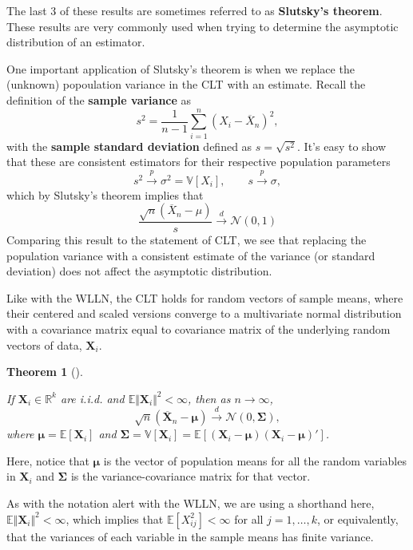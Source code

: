 \documentclass[
  letterpaper,
  DIV=11,
  numbers=noendperiod]{scrreprt}
\newcommand{\mb}{\symbf}
\newcommand{\E}{\mathbb{E}}
\newcommand{\V}{\mathbb{V}}
\newcommand{\N}{\mathcal{N}}
\newcommand{\Xbar}{\overline{X}}
\newcommand{\X}{\mb{X}}
\newcommand{\inprob}{\overset{p}{\to}}
\newcommand{\indist}{\overset{d}{\to}}
\theoremstyle{definition}
\theoremstyle{plain}
\newtheorem{theorem}{Theorem}[chapter]
\theoremstyle{definition}
\theoremstyle{remark}
\begin{document}
The last 3 of these results are sometimes referred to as
\textbf{Slutsky's theorem}. These results are very commonly used when
trying to determine the asymptotic distribution of an estimator.

One important application of Slutsky's theorem is when we replace the
(unknown) popoulation variance in the CLT with an estimate. Recall the
definition of the \textbf{sample variance} as \[
s^2 = \frac{1}{n-1} \sum_{i=1}^n (X_i - \Xbar_n)^2,
\] with the \textbf{sample standard deviation} defined as
\(s = \sqrt{s^2}\). It's easy to show that these are consistent
estimators for their respective population parameters \[ 
s^2 \inprob \sigma^2 = \V[X_i], \qquad s \inprob \sigma,
\] which by Slutsky's theorem implies that \[
\frac{\sqrt{n}\left(\Xbar_n - \mu\right)}{s} \indist \N(0, 1)
\] Comparing this result to the statement of CLT, we see that replacing
the population variance with a consistent estimate of the variance (or
standard deviation) does not affect the asymptotic distribution.

Like with the WLLN, the CLT holds for random vectors of sample means,
where their centered and scaled versions converge to a multivariate
normal distribution with a covariance matrix equal to covariance matrix
of the underlying random vectors of data, \(\X_i\).

\leavevmode{}%
\begin{theorem}[]\label{thm-multivariate-clt}

If \(\mb{X}_i \in \mathbb{R}^k\) are i.i.d. and
\(\E\Vert \mb{X}_i \Vert^2 < \infty\), then as \(n \to \infty\), \[
\sqrt{n}\left( \overline{\mb{X}}_n - \mb{\mu}\right) \indist \N(0, \mb{\Sigma}),
\] where \(\mb{\mu} = \E[\mb{X}_i]\) and
\(\mb{\Sigma} = \V[\mb{X}_i] = \E\left[(\mb{X}_i-\mb{\mu})(\mb{X}_i - \mb{\mu})'\right]\).

\end{theorem}

Here, notice that \(\mb{\mu}\) is the vector of population means for all
the random variables in \(\X_i\) and \(\mb{\Sigma}\) is the
variance-covariance matrix for that vector.

\begin{tcolorbox}[enhanced jigsaw, title=\textcolor{quarto-callout-note-color}{\faInfo}\hspace{0.5em}{Note}, breakable, titlerule=0mm, opacityback=0, rightrule=.15mm, bottomrule=.15mm, colframe=quarto-callout-note-color-frame, coltitle=black, colbacktitle=quarto-callout-note-color!10!white, bottomtitle=1mm, toptitle=1mm, colback=white, arc=.35mm, opacitybacktitle=0.6, toprule=.15mm, leftrule=.75mm, left=2mm]

As with the notation alert with the WLLN, we are using a shorthand here,
\(\E\Vert \mb{X}_i \Vert^2 < \infty\), which implies that
\(\E[X_{ij}^2] < \infty\) for all \(j = 1,\ldots, k\), or equivalently,
that the variances of each variable in the sample means has finite
variance.

\end{tcolorbox}
\end{document}
